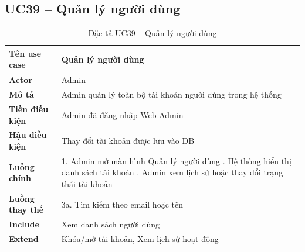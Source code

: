 \subsection*{UC39 -- Quản lý người dùng}
\begin{table}[H]
    \captionsetup{justification=raggedright, singlelinecheck=false}
    \caption{Đặc tả UC39 -- Quản lý người dùng}
\centering
\begin{tabular}{|p{3.5cm}|p{10cm}|}
\hline
\textbf{Tên use case} & Quản lý người dùng \\
\hline
\textbf{Actor} & Admin \\
\hline
\textbf{Mô tả} & Admin quản lý toàn bộ tài khoản người
  dùng trong hệ thống \\
\hline
\textbf{Tiền điều kiện} & Admin đã đăng nhập Web Admin \\
\hline
\textbf{Hậu điều kiện} & Thay đổi tài khoản được lưu vào DB \\
\hline
\textbf{Luồng chính} &
  1. Admin mở màn hình Quản lý người dùng \newline
  2. Hệ thống hiển thị danh sách tài khoản \newline
  3. Admin xem lịch sử hoặc thay đổi trạng thái tài khoản \\
\hline
\textbf{Luồng thay thế} &
  3a. Tìm kiếm theo email hoặc tên \\
\hline
\textbf{Include} & Xem danh sách người dùng \\
\hline
\textbf{Extend} & Khóa/mở tài khoản, Xem lịch sử hoạt động \\
\hline
\end{tabular}

\end{table}

